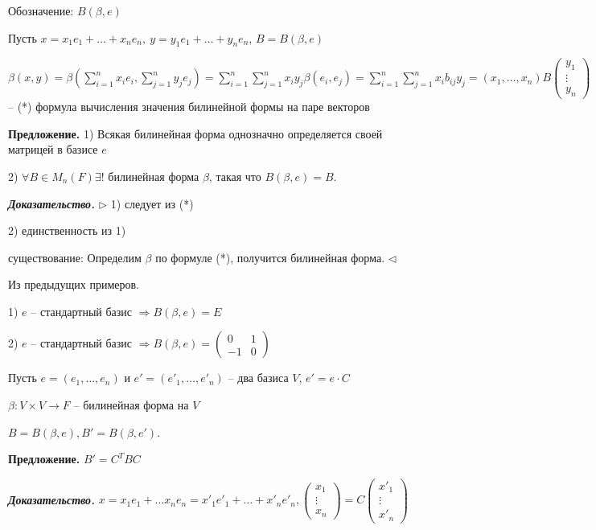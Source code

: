 Обозначение: $B(\beta, e)$

\bigskip
Пусть $x = x_1e_1 + \dots + x_n e_n, \ y = y_1 e_1 + \dots + y_n e_n$, $B = B(\beta, e)$

\bigskip
$\beta(x, y) = \beta(\sum\limits_{i=1}^n x_i e_i, \sum\limits_{j=1}^n y_j e_j) = \sum\limits_{i=1}^n \sum\limits_{j=1}^n x_i y_j \beta(e_i, e_j) = \sum\limits_{i=1}^n \sum\limits_{j=1}^n x_i b_{ij} y_j = (x_1, \dots, x_n) B \begin{pmatrix} y_1 \\ \vdots \\ y_n \end{pmatrix}$ -- (*) формула вычисления значения билинейной формы на паре векторов

\bigskip
\textbf{Предложение.} 1) Всякая билинейная форма однозначно определяется своей матрицей в базисе $e$

2) $\forall B \in M_n (F) \exists !$ билинейная форма $\beta$, такая что $B(\beta, e) = B$.

\bigskip
\textbf{\textit{Доказательство.}} $\rhd$ 1) следует из (*)

2) единственность из 1)

существование: Определим $\beta$ по формуле (*), получится билинейная форма. $\lhd$

\bigskip
Из предыдущих примеров.

1) $e$ -- стандартный базис $\Rightarrow B(\beta, e) = E$

2) $e$ -- стандартный базис $\Rightarrow B(\beta, e) = \begin{pmatrix} 0 & 1 \\ -1 & 0 \end{pmatrix} $

\bigskip
Пусть $e = (e_1, \dots, e_n)$ и $e' = (e'_1, \dots, e'_n)$ -- два базиса $V$, $e' = e \cdot C$

$\beta : V \times V \rightarrow F$ -- билинейная форма на $V$

$B = B(\beta, e), B' = B(\beta, e')$.

\bigskip
\textbf{Предложение.} $B' = C^{T} BC$

\bigskip
\textbf{\textit{Доказательство.}} $x = x_1 e_1 + \dots x_n e_n = x'_1 e'_1 + \dots + x'_n e'_n, \begin{pmatrix} x_1 \\ \vdots \\ x_n \end{pmatrix} = C \begin{pmatrix} x'_1 \\ \vdots \\ x'_n \end{pmatrix}$

